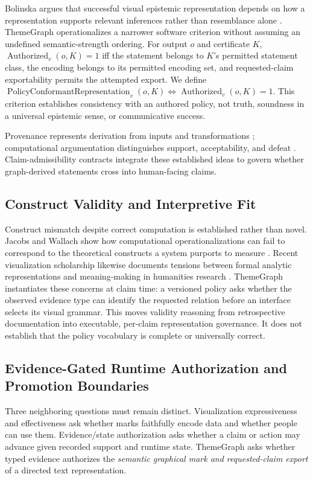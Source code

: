 \documentclass[manuscript,screen,review,anonymous]{acmart}
\begin{document}
Bolinska argues that successful visual epistemic representation depends on how a representation supports relevant inferences rather than resemblance alone \cite{bolinska2016}. ThemeGraph operationalizes a narrower software criterion without assuming an undefined semantic-strength ordering. For output $o$ and certificate $K$, $\operatorname{Authorized}_v(o,K)=1$ iff the statement belongs to $K$'s permitted statement class, the encoding belongs to its permitted encoding set, and requested-claim exportability permits the attempted export. We define $\operatorname{PolicyConformantRepresentation}_v(o,K)\Leftrightarrow\operatorname{Authorized}_v(o,K)=1$. This criterion establishes consistency with an authored policy, not truth, soundness in a universal epistemic sense, or communicative success.

Provenance represents derivation from inputs and transformations \cite{green2007}; computational argumentation distinguishes support, acceptability, and defeat \cite{dung1995}. Claim-admissibility contracts integrate these established ideas to govern whether graph-derived statements cross into human-facing claims.

\subsection{Construct Validity and Interpretive Fit}

Construct mismatch despite correct computation is established rather than novel. Jacobs and Wallach show how computational operationalizations can fail to correspond to the theoretical constructs a system purports to measure \cite{jacobs2021}. Recent visualization scholarship likewise documents tensions between formal analytic representations and meaning-making in humanities research \cite{benitosantos2026}. ThemeGraph instantiates these concerns at claim time: a versioned policy asks whether the observed evidence type can identify the requested relation before an interface selects its visual grammar. This moves validity reasoning from retrospective documentation into executable, per-claim representation governance. It does not establish that the policy vocabulary is complete or universally correct.

\subsection{Evidence-Gated Runtime Authorization and Promotion Boundaries}

Three neighboring questions must remain distinct. Visualization expressiveness and effectiveness ask whether marks faithfully encode data and whether people can use them. Evidence/state authorization asks whether a claim or action may advance given recorded support and runtime state. ThemeGraph asks whether typed evidence authorizes the \emph{semantic graphical mark and requested-claim export} of a directed text representation.
\end{document}
